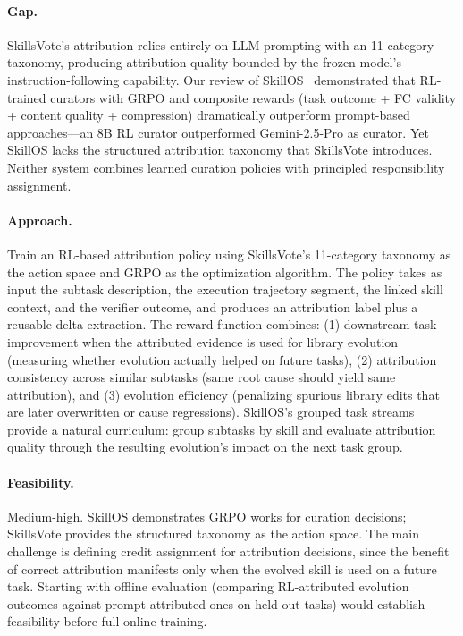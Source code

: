 \documentclass[11pt,a4paper]{article}
\begin{document}
\paragraph{Gap.} SkillsVote's attribution relies entirely on LLM prompting with an 11-category taxonomy, producing attribution quality bounded by the frozen model's instruction-following capability. Our review of SkillOS~\cite{skillos} demonstrated that RL-trained curators with GRPO and composite rewards (task outcome + FC validity + content quality + compression) dramatically outperform prompt-based approaches---an 8B RL curator outperformed Gemini-2.5-Pro as curator. Yet SkillOS lacks the structured attribution taxonomy that SkillsVote introduces. Neither system combines learned curation policies with principled responsibility assignment.

\paragraph{Approach.} Train an RL-based attribution policy using SkillsVote's 11-category taxonomy as the action space and GRPO as the optimization algorithm. The policy takes as input the subtask description, the execution trajectory segment, the linked skill context, and the verifier outcome, and produces an attribution label plus a reusable-delta extraction. The reward function combines: (1) downstream task improvement when the attributed evidence is used for library evolution (measuring whether evolution actually helped on future tasks), (2) attribution consistency across similar subtasks (same root cause should yield same attribution), and (3) evolution efficiency (penalizing spurious library edits that are later overwritten or cause regressions). SkillOS's grouped task streams provide a natural curriculum: group subtasks by skill and evaluate attribution quality through the resulting evolution's impact on the next task group.

\paragraph{Feasibility.} Medium-high. SkillOS demonstrates GRPO works for curation decisions; SkillsVote provides the structured taxonomy as the action space. The main challenge is defining credit assignment for attribution decisions, since the benefit of correct attribution manifests only when the evolved skill is used on a future task. Starting with offline evaluation (comparing RL-attributed evolution outcomes against prompt-attributed ones on held-out tasks) would establish feasibility before full online training.
\end{document}
